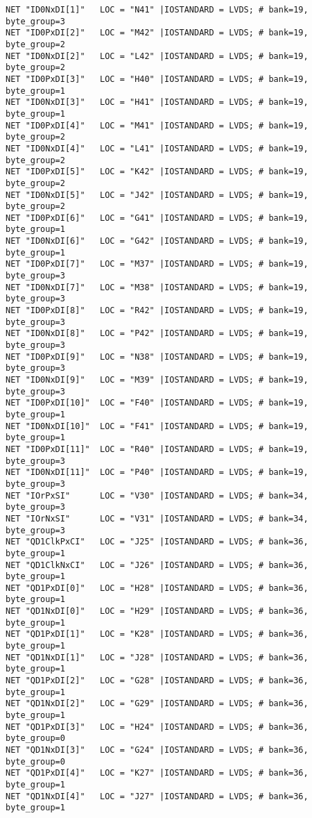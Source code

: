 \begin{appendix}
{\begin{verbatim}
NET "ID0NxDI[1]"   LOC = "N41" |IOSTANDARD = LVDS; # bank=19, byte_group=3
NET "ID0PxDI[2]"   LOC = "M42" |IOSTANDARD = LVDS; # bank=19, byte_group=2
NET "ID0NxDI[2]"   LOC = "L42" |IOSTANDARD = LVDS; # bank=19, byte_group=2
NET "ID0PxDI[3]"   LOC = "H40" |IOSTANDARD = LVDS; # bank=19, byte_group=1
NET "ID0NxDI[3]"   LOC = "H41" |IOSTANDARD = LVDS; # bank=19, byte_group=1
NET "ID0PxDI[4]"   LOC = "M41" |IOSTANDARD = LVDS; # bank=19, byte_group=2
NET "ID0NxDI[4]"   LOC = "L41" |IOSTANDARD = LVDS; # bank=19, byte_group=2
NET "ID0PxDI[5]"   LOC = "K42" |IOSTANDARD = LVDS; # bank=19, byte_group=2
NET "ID0NxDI[5]"   LOC = "J42" |IOSTANDARD = LVDS; # bank=19, byte_group=2
NET "ID0PxDI[6]"   LOC = "G41" |IOSTANDARD = LVDS; # bank=19, byte_group=1
NET "ID0NxDI[6]"   LOC = "G42" |IOSTANDARD = LVDS; # bank=19, byte_group=1
NET "ID0PxDI[7]"   LOC = "M37" |IOSTANDARD = LVDS; # bank=19, byte_group=3
NET "ID0NxDI[7]"   LOC = "M38" |IOSTANDARD = LVDS; # bank=19, byte_group=3
NET "ID0PxDI[8]"   LOC = "R42" |IOSTANDARD = LVDS; # bank=19, byte_group=3
NET "ID0NxDI[8]"   LOC = "P42" |IOSTANDARD = LVDS; # bank=19, byte_group=3
NET "ID0PxDI[9]"   LOC = "N38" |IOSTANDARD = LVDS; # bank=19, byte_group=3
NET "ID0NxDI[9]"   LOC = "M39" |IOSTANDARD = LVDS; # bank=19, byte_group=3
NET "ID0PxDI[10]"  LOC = "F40" |IOSTANDARD = LVDS; # bank=19, byte_group=1
NET "ID0NxDI[10]"  LOC = "F41" |IOSTANDARD = LVDS; # bank=19, byte_group=1
NET "ID0PxDI[11]"  LOC = "R40" |IOSTANDARD = LVDS; # bank=19, byte_group=3
NET "ID0NxDI[11]"  LOC = "P40" |IOSTANDARD = LVDS; # bank=19, byte_group=3
NET "IOrPxSI"      LOC = "V30" |IOSTANDARD = LVDS; # bank=34, byte_group=3
NET "IOrNxSI"      LOC = "V31" |IOSTANDARD = LVDS; # bank=34, byte_group=3
NET "QD1ClkPxCI"   LOC = "J25" |IOSTANDARD = LVDS; # bank=36, byte_group=1
NET "QD1ClkNxCI"   LOC = "J26" |IOSTANDARD = LVDS; # bank=36, byte_group=1
NET "QD1PxDI[0]"   LOC = "H28" |IOSTANDARD = LVDS; # bank=36, byte_group=1
NET "QD1NxDI[0]"   LOC = "H29" |IOSTANDARD = LVDS; # bank=36, byte_group=1
NET "QD1PxDI[1]"   LOC = "K28" |IOSTANDARD = LVDS; # bank=36, byte_group=1
NET "QD1NxDI[1]"   LOC = "J28" |IOSTANDARD = LVDS; # bank=36, byte_group=1
NET "QD1PxDI[2]"   LOC = "G28" |IOSTANDARD = LVDS; # bank=36, byte_group=1
NET "QD1NxDI[2]"   LOC = "G29" |IOSTANDARD = LVDS; # bank=36, byte_group=1
NET "QD1PxDI[3]"   LOC = "H24" |IOSTANDARD = LVDS; # bank=36, byte_group=0
NET "QD1NxDI[3]"   LOC = "G24" |IOSTANDARD = LVDS; # bank=36, byte_group=0
NET "QD1PxDI[4]"   LOC = "K27" |IOSTANDARD = LVDS; # bank=36, byte_group=1
NET "QD1NxDI[4]"   LOC = "J27" |IOSTANDARD = LVDS; # bank=36, byte_group=1

\end{verbatim}}
\end{appendix}
